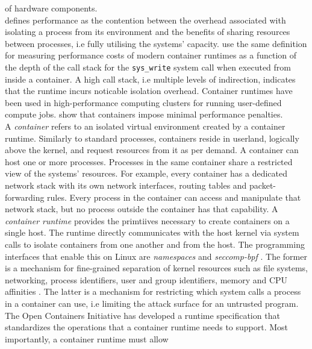 \documentclass[english]{lni}
\begin{document}
of hardware components. \\
\citeauthor{10.1145/3365199} \cite{10.1145/3365199} defines performance as 
the contention between the overhead associated with isolating a process 
from its environment and the benefits of sharing resources between processes, 
i.e fully utilising the systems' capacity. 
\citeauthor{10.1145/3381052.3381315} \cite{10.1145/3381052.3381315} use 
the same definition for measuring performance costs of modern 
container runtimes as a function of the depth of the call stack for the 
\verb|sys_write| system call when executed from inside a container. A high call
stack, i.e multiple levels of indirection, indicates that the runtime incurs
noticable isolation overhead. Container runtimes have been used 
in high-performance computing clusters for running user-defined compute jobs.
\citeauthor{10.1145/3126908.3126925} \cite{10.1145/3126908.3126925} show 
that containers impose minimal performance penalties.\\
A \textit{container} refers to an isolated virtual environment created by 
a container runtime.  
Similarly to standard processes, containers reside in userland, 
logically above the kernel, and request resources from it 
as per demand. A container can host one or more processes. Processes 
in the same container share a restricted view of the systems' resources. 
For example, every container has a dedicated network stack with its own 
network interfaces, routing tables and packet-forwarding rules. 
Every process in the container can access and manipulate that network stack, 
but no process outside the container has that capability.
A \textit{container runtime} provides the primtiives necessary to create 
containers on a single host. The runtime directly communicates with 
the host kernel via system calls to isolate containers from one another 
and from the host. The programming interfaces that enable this on Linux are 
\textit{namespaces} \cite{namespaces-man-page} and 
\textit{seccomp-bpf} \cite{seccomp-bpf-kernel-doc}. 
The former is a mechanism for fine-grained separation of kernel resources 
such as file systems, networking, process identifiers, user and group 
identifiers, memory and CPU affinities \cite{ns-in-op}. The latter is a mechanism 
for restricting which system calls a process in a container can use, 
i.e limiting the attack surface for an untrusted program.  
The Open Containers Initiative \cite{oci-runtime} has developed 
a runtime specification that standardizes the operations that a container 
runtime needs to support. Most importantly, a container runtime must allow 
\end{document}
